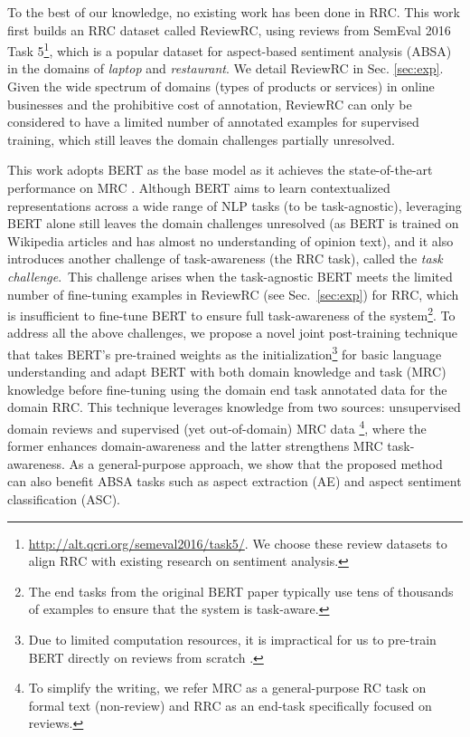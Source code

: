 \documentclass[11pt,a4paper]{article}
\begin{document}
To the best of our knowledge, no existing work has been done in RRC. This work first builds an RRC dataset called ReviewRC, using reviews from SemEval 2016 Task 5\footnote{\url{http://alt.qcri.org/semeval2016/task5/}. We choose these review datasets to align RRC with existing research on sentiment analysis.}, which is a popular dataset for aspect-based sentiment analysis (ABSA) \cite{hu2004mining} in the domains of \emph{laptop} and \emph{restaurant}.
We detail ReviewRC in Sec. \ref{sec:exp}.
Given the wide spectrum of domains (types of products or services) in online businesses and the prohibitive cost of annotation, ReviewRC can only be considered to have a limited number of annotated examples for supervised training, which still leaves the domain challenges partially unresolved.

This work adopts BERT 
\cite{devlin2018bert} as the base model as it achieves the state-of-the-art performance on MRC \cite{rajpurkar2016squad,rajpurkar2018know}.
Although BERT aims to learn contextualized representations across a wide range of NLP tasks (to be task-agnostic), leveraging BERT alone still leaves the domain challenges unresolved (as BERT is trained on Wikipedia articles and has almost no understanding of opinion text), and it also introduces another challenge of task-awareness (the RRC task), called the \textit{task challenge}.~This challenge arises when the task-agnostic BERT meets the limited number of fine-tuning examples in ReviewRC (see Sec.~\ref{sec:exp}) for RRC, which is insufficient to fine-tune BERT to ensure full task-awareness of the system\footnote{The end tasks from the original BERT paper typically use tens of thousands of examples to ensure that the system is task-aware.}. 
To address all the above challenges,
we propose a novel joint post-training technique that takes BERT's pre-trained weights as the initialization\footnote{Due to limited computation resources, it is impractical for us to pre-train BERT directly on reviews from scratch \cite{devlin2018bert}.} for basic language understanding and adapt BERT with both domain knowledge and task (MRC) knowledge before fine-tuning using the domain end task annotated data for the domain RRC.
This technique leverages knowledge from two sources: unsupervised domain reviews and supervised (yet out-of-domain) MRC data \footnote{To simplify the writing, we refer MRC as a general-purpose RC task on formal text (non-review) and RRC as an end-task specifically focused on reviews.}, where the former enhances domain-awareness and the latter strengthens MRC task-awareness.
As a general-purpose approach, we show that the proposed method can also benefit ABSA tasks such as aspect extraction (AE) and aspect sentiment classification (ASC).
\end{document}
